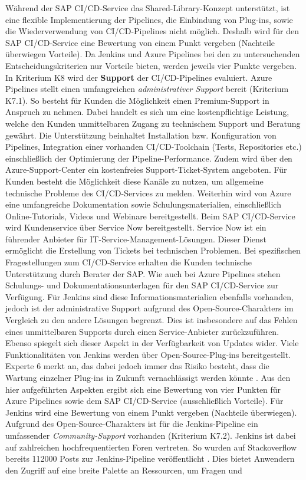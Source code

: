 \vspace*{-15mm}
Während der SAP CI/CD-Service das Shared-Library-Konzept unterstützt, ist eine flexible Implementierung der Pipelines, die Einbindung von Plug-ins, sowie die Wiederverwendung von CI/CD-Pipelines nicht möglich. Deshalb wird für den SAP CI/CD-Service eine Bewertung von einem Punkt vergeben (Nachteile überwiegen Vorteile). Da Jenkins und Azure Pipelines bei den zu untersuchenden Entscheidungskriterien nur Vorteile bieten, werden jeweils vier Punkte vergeben.\\
In Kriterium K8 wird der \textbf{Support} der CI/CD-Pipelines evaluiert. Azure Pipelines stellt  einen umfangreichen \textit{administrativer Support} bereit (Kriterium K7.1). So besteht für Kunden die Möglichkeit einen Premium-Support in Anspruch zu nehmen. Dabei handelt es sich um eine kostenpflichtige Leistung, welche den Kunden unmittelbaren Zugang zu technischem Support und Beratung gewährt. Die Unterstützung beinhaltet Installation bzw. Konfiguration von Pipelines, Integration einer vorhanden CI/CD-Toolchain (Tests, Repositories etc.) einschließlich der Optimierung der Pipeline-Performance. Zudem wird über den Azure-Support-Center ein kostenfreies Support-Ticket-System angeboten. Für Kunden besteht die Möglichkeit diese Kanäle zu nutzen, um allgemeine technische Probleme des CI/CD-Services zu melden. Weiterhin wird von Azure eine umfangreiche Dokumentation sowie Schulungsmaterialien, einschließlich Online-Tutorials, Videos und Webinare bereitgestellt. Beim SAP CI/CD-Service wird Kundenservice über Service Now bereitgestellt. Service Now ist ein führender Anbieter für IT-Service-Management-Lösungen. Dieser Dienst ermöglicht die Erstellung von Tickets bei technischen Problemen. Bei spezifischen Fragestellungen zum CI/CD-Service erhalten die Kunden technische Unterstützung durch Berater der SAP. Wie auch bei Azure Pipelines stehen Schulungs- und Dokumentationsunterlagen für den SAP CI/CD-Service zur Verfügung. Für Jenkins sind diese Informationsmaterialien ebenfalls vorhanden, jedoch ist der administrative Support aufgrund des Open-Source-Charakters im Vergleich zu den andere Lösungen begrenzt. Dies ist insbesondere auf das Fehlen eines unmittelbaren Supports durch einen Service-Anbieter zurückzuführen. Ebenso spiegelt sich dieser Aspekt in der Verfügbarkeit von Updates wider. Viele Funktionalitäten von Jenkins werden über Open-Source-Plug-ins bereitgestellt. Experte 6 merkt an, das dabei jedoch immer das Risiko besteht, dass die Wartung einzelner Plug-ins in Zukunft vernachlässigt werden könnte \cite[Z.30]{FullStackEntwicklerSAPDTSIntegration.}. Aus den hier aufgeführten Aspekten ergibt sich eine Bewertung von vier Punkten für Azure Pipelines sowie dem SAP CI/CD-Service (ausschließlich Vorteile). Für Jenkins wird eine Bewertung von einem Punkt vergeben (Nachteile überwiegen). Aufgrund des Open-Source-Charakters ist für die Jenkins-Pipeline ein umfassender \textit{Community-Support} vorhanden (Kriterium K7.2). Jenkins ist dabei auf zahlreichen hochfrequentierten Foren vertreten. So wurden auf Stackoverflow bereits 112000 Posts zur Jenkins-Pipeline veröffentlicht \cite{StackOverflow.20230403d}. Dies bietet Anwendern den Zugriff auf eine breite Palette an Ressourcen, um Fragen und 